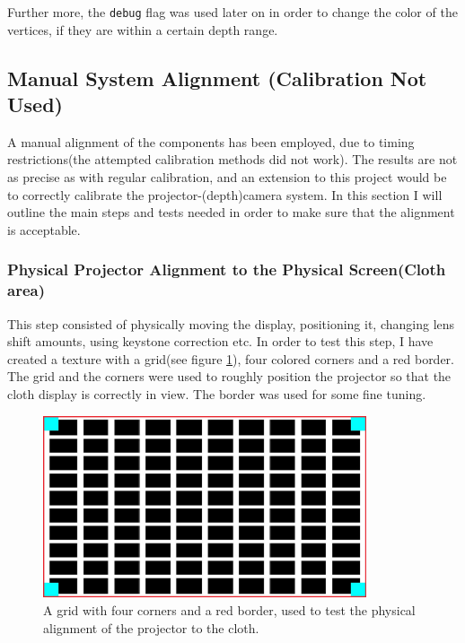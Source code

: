 \documentclass[]{article}
\begin{document}
Further more, the \verb|debug| flag was used later on in order to change the color of the vertices, if they are within a certain depth range.


\subsection{Manual System Alignment (Calibration Not Used)}
\label{sec:ManualAlignment}

A manual alignment of the components has been employed, due to timing restrictions(the attempted calibration methods did not work). The results are not as precise as with regular calibration, and an extension to this project would be to correctly calibrate the projector-(depth)camera system. In this section I will outline the main steps and tests needed in order to make sure that the alignment is acceptable.

\subsubsection{Physical Projector Alignment to the Physical Screen(Cloth area)}

This step consisted of physically moving the display, positioning it, changing lens shift amounts, using keystone correction etc. In order to test this step, I have created a texture with a grid(see figure \ref{fig:CalibrationGrid}), four colored corners and a red border. The grid and the corners were used to roughly position the projector so that the cloth display is correctly in view. The border was used for some fine tuning. 

\begin{figure}[hbtp]
    \centering
    \includegraphics[width=0.85\textwidth]{figures/CalibrationGrid.jpg}
    \caption{A grid with four corners and a red border, used to test the physical alignment of the projector to the cloth.}
    \label{fig:CalibrationGrid}
\end{figure}
\end{document}
